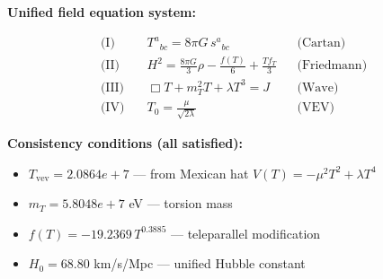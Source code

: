 
\textbf{Unified field equation system:}

\begin{align}
  \text{(I)} \quad & T^a{}_{bc} = 8\pi G \, s^a{}_{bc} && \text{(Cartan)} \\
  \text{(II)} \quad & H^2 = \frac{8\pi G}{3}\rho - \frac{f(T)}{6} + \frac{Tf_T}{3} && \text{(Friedmann)} \\
  \text{(III)} \quad & \Box T + m_T^2 T + \lambda T^3 = J && \text{(Wave)} \\
  \text{(IV)} \quad & T_0 = \frac{\mu}{\sqrt{2\lambda}} && \text{(VEV)}
\end{align}

\textbf{Consistency conditions (all satisfied):}
\begin{itemize}
  \item $T_{\text{vev}} = 2.0864e+7$ — from Mexican hat $V(T) = -\mu^2 T^2 + \lambda T^4$
  \item $m_T = 5.8048e+7$ eV — torsion mass
  \item $f(T) = -19.2369 \, T^{0.3885}$ — teleparallel modification
  \item $H_0 = 68.80$ km/s/Mpc — unified Hubble constant
\end{itemize}